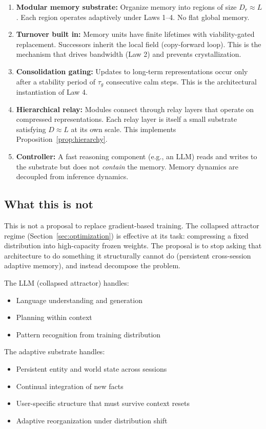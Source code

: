 \documentclass[12pt]{article}
\begin{document}
\begin{enumerate}
  \item \textbf{Modular memory substrate:} Organize memory into regions of size $D_r \approx L$. Each region operates adaptively under Laws 1--4. No flat global memory.
  \item \textbf{Turnover built in:} Memory units have finite lifetimes with viability-gated replacement. Successors inherit the local field (copy-forward loop). This is the mechanism that drives bandwidth (Law 2) and prevents crystallization.
  \item \textbf{Consolidation gating:} Updates to long-term representations occur only after a stability period of $\tau_g$ consecutive calm steps. This is the architectural instantiation of Law 4.
  \item \textbf{Hierarchical relay:} Modules connect through relay layers that operate on compressed representations. Each relay layer is itself a small substrate satisfying $D \approx L$ at its own scale. This implements Proposition~\ref{prop:hierarchy}.
  \item \textbf{Controller:} A fast reasoning component (e.g., an LLM) reads and writes to the substrate but does not \emph{contain} the memory. Memory dynamics are decoupled from inference dynamics.
\end{enumerate}

\subsection{What this is not}

This is not a proposal to replace gradient-based training. The collapsed attractor regime (Section~\ref{sec:optimization}) is effective at its task: compressing a fixed distribution into high-capacity frozen weights. The proposal is to stop asking that architecture to do something it structurally cannot do (persistent cross-session adaptive memory), and instead decompose the problem.

The LLM (collapsed attractor) handles:
\begin{itemize}
  \item Language understanding and generation
  \item Planning within context
  \item Pattern recognition from training distribution
\end{itemize}

The adaptive substrate handles:
\begin{itemize}
  \item Persistent entity and world state across sessions
  \item Continual integration of new facts
  \item User-specific structure that must survive context resets
  \item Adaptive reorganization under distribution shift
\end{itemize}
\end{document}
